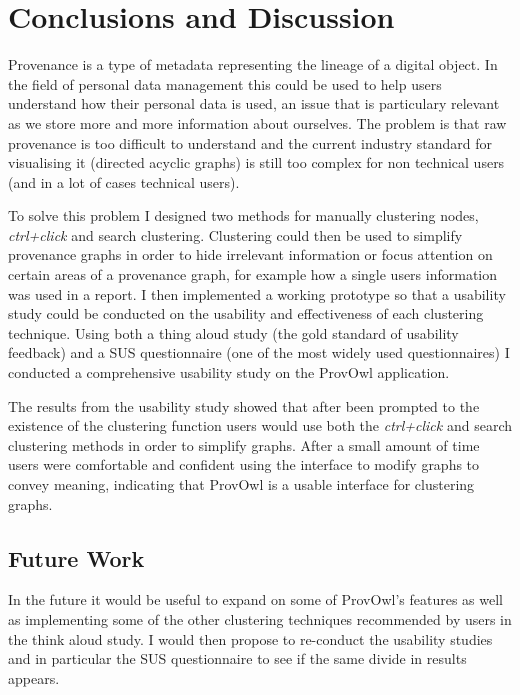 \chapter{Conclusions and Discussion} %

Provenance is a type of metadata representing the lineage of a digital object. In the field of personal data management this could be used to help users understand how their personal data is used, an issue that is particulary relevant as we store more and more information about ourselves. The problem is that raw provenance is too difficult to understand and the current industry standard for visualising it (directed acyclic graphs) is still too complex for non technical users (and in a lot of cases technical users). 

To solve this problem I designed two methods for manually clustering nodes, \textit{ctrl+click} and search clustering. Clustering could then be used to simplify provenance graphs in order to hide irrelevant information or focus attention on certain areas of a provenance graph, for example how a single users information was used in a report. I then implemented a working prototype so that a usability study could be conducted on the usability and effectiveness of each clustering technique. Using both a thing aloud study (the gold standard of usability feedback) and a SUS questionnaire (one of the most widely used questionnaires) I conducted a comprehensive usability study on the ProvOwl application. 

The results from the usability study showed that after been prompted to the existence of the clustering function users would use both the \textit{ctrl+click} and search clustering methods in order to simplify graphs. After a small amount of time users were comfortable and confident using the interface to modify graphs to convey meaning, indicating that ProvOwl is a usable interface for clustering graphs.



\section{Future Work}

In the future it would be useful to expand on some of ProvOwl's features as well as implementing some of the other clustering techniques recommended by users in the think aloud study. I would then propose to re-conduct the usability studies and in particular the SUS questionnaire to see if the same divide in results appears.

